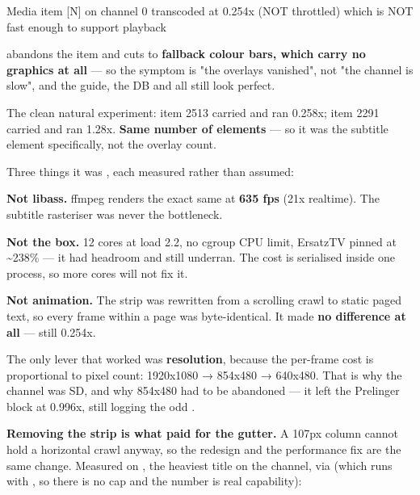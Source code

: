 \documentclass[fontpath=fonts/,logopath=logo/]{riposte-doc}
\begin{document}
\ripcodeopen
{}
\begin{ripcodeblock}
[FTL] Media item [N] on channel 0 transcoded at 0.254x (NOT throttled)
      which is NOT fast enough to support playback
\end{ripcodeblock}
\ripcodesizereset\ripcodeclose

abandons the item and cuts to \textbf{fallback colour bars, which carry no graphics at all} — so the symptom is "the overlays vanished", not "the channel is slow", and the guide, the DB and  all still look perfect.

The clean natural experiment: item 2513 carried  and ran 0.258x; item 2291 carried  and ran 1.28x. \textbf{Same number of elements} — so it was the subtitle element specifically, not the overlay count.

Three things it was , each measured rather than assumed:

\begin{ripbullets}
\item \textbf{Not libass.} ffmpeg renders the exact same  at \textbf{635 fps} (21x realtime). The subtitle rasteriser was never the bottleneck.
\item \textbf{Not the box.} 12 cores at load 2.2, no cgroup CPU limit, ErsatzTV pinned at \textasciitilde{}238\% — it had headroom and still underran. The cost is serialised inside one process, so more cores will not fix it.
\item \textbf{Not animation.} The strip was rewritten from a scrolling  crawl to static paged text, so every frame within a page was byte-identical. It made \textbf{no difference at all} — still 0.254x.
\end{ripbullets}

The only lever that worked was \textbf{resolution}, because the per-frame cost is proportional to pixel count: 1920x1080 → 854x480 → 640x480. That is why the channel was SD, and why 854x480 had to be abandoned — it left the Prelinger block at 0.996x, still logging the odd \ripmono{[FTL]}.

\textbf{Removing the strip is what paid for the gutter.} A 107px column cannot hold a horizontal crawl anyway, so the redesign and the performance fix are the same change. Measured on , the heaviest title on the channel, via  (which runs with , so there is no  cap and the number is real capability):
\end{document}
